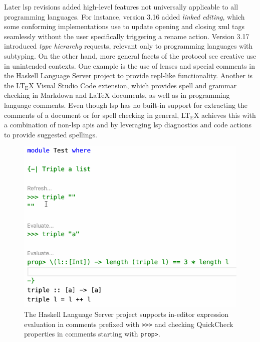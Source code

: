 Later \acrshort{lsp} revisions added high-level features not universally
applicable to all programming languages. For instance, version 3.16 added
\emph{linked editing}, which some conforming implementations use to update
opening and closing \acrshort{xml} tags seamlessly without the user specifically
triggering a rename action. Version 3.17 introduced \emph{type hierarchy}
requests, relevant only to programming languages with subtyping. On the other
hand, more general facets of the protocol see creative use in unintended
contexts. One example is the use of lenses and special comments in the Haskell
Language Server project\cite{haskell-ls} to provide \acrshort{repl}-like
functionality. Another is the LT$_\text{E}$X Visual Studio Code
extension\cite{vscode-spellcheck}, which provides spell and grammar checking in
Markdown and \LaTeX{} documents, as well as in programming language comments.
Even though \acrshort{lsp} has no built-in support for extracting the comments
of a document or for spell checking in general, LT$_\text{E}$X achieves this
with a combination of non-\acrshort{lsp} \acrshort{api}s and by leveraging
\acrshort{lsp} diagnostics and code actions to provide suggested spellings.

\begin{figure}[h]\centering
	\includegraphics[height=0.3\textheight]{resources/code_haskell_repl.png}
	\caption{The Haskell Language Server project supports in-editor expression
	evaluation in comments prefixed with \texttt{>>>} and checking QuickCheck
	properties in comments starting with \texttt{prop>}.}
\end{figure}

